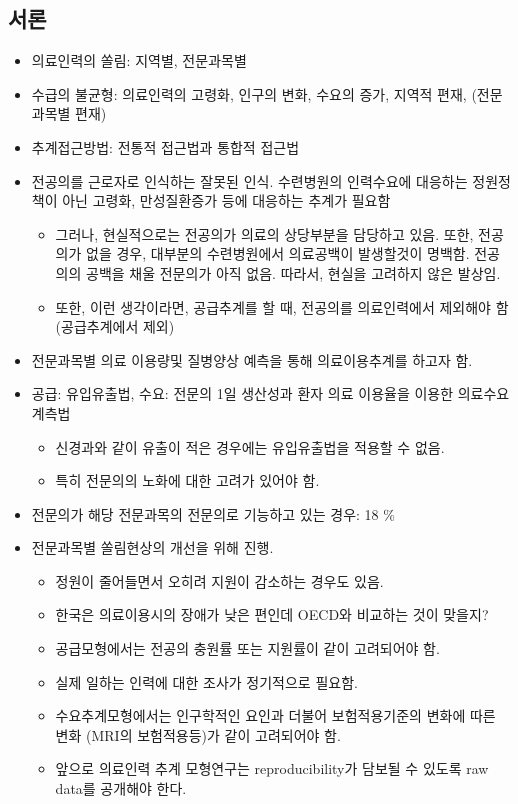 \documentclass[]{book}
\providecommand{\tightlist}{%
  \setlength{\itemsep}{0pt}\setlength{\parskip}{0pt}}
\begin{document}
\hypertarget{section-4}{%
\subsection{서론}\label{section-4}}

\begin{itemize}
\item
  의료인력의 쏠림: 지역별, 전문과목별
\item
  수급의 불균형: 의료인력의 고령화, 인구의 변화, 수요의 증가, 지역적 편재, (전문과목별 편재)
\item
  추계접근방법: 전통적 접근법과 통합적 접근법
\item
  전공의를 근로자로 인식하는 잘못된 인식. 수련병원의 인력수요에 대응하는 정원정책이 아닌 고령화, 만성질환증가 등에 대응하는 추계가 필요함

  \begin{itemize}
  \tightlist
  \item
    그러나, 현실적으로는 전공의가 의료의 상당부분을 담당하고 있음. 또한, 전공의가 없을 경우, 대부분의 수련병원에서 의료공백이 발생할것이 명백함. 전공의의 공백을 채울 전문의가 아직 없음. 따라서, 현실을 고려하지 않은 발상임.
  \item
    또한, 이런 생각이라면, 공급추계를 할 때, 전공의를 의료인력에서 제외해야 함 (공급추계에서 제외)
  \end{itemize}
\item
  전문과목별 의료 이용량및 질병양상 예측을 통해 의료이용추계를 하고자 함.
\item
  공급: 유입유출법, 수요: 전문의 1일 생산성과 환자 의료 이용율을 이용한 의료수요 계측법

  \begin{itemize}
  \tightlist
  \item
    신경과와 같이 유출이 적은 경우에는 유입유출법을 적용할 수 없음.
  \item
    특히 전문의의 노화에 대한 고려가 있어야 함.
  \end{itemize}
\item
  전문의가 해당 전문과목의 전문의로 기능하고 있는 경우: 18 \%
\item
  전문과목별 쏠림현상의 개선을 위해 진행.

  \begin{itemize}
  \item
    정원이 줄어들면서 오히려 지원이 감소하는 경우도 있음.
  \item
    한국은 의료이용시의 장애가 낮은 편인데 OECD와 비교하는 것이 맞을지?
  \item
    공급모형에서는 전공의 충원률 또는 지원률이 같이 고려되어야 함.
  \item
    실제 일하는 인력에 대한 조사가 정기적으로 필요함.
  \item
    수요추계모형에서는 인구학적인 요인과 더불어 보험적용기준의 변화에 따른 변화 (MRI의 보험적용등)가 같이 고려되어야 함.
  \item
    앞으로 의료인력 추계 모형연구는 reproducibility가 담보될 수 있도록 raw data를 공개해야 한다.
  \end{itemize}
\end{itemize}
\end{document}
